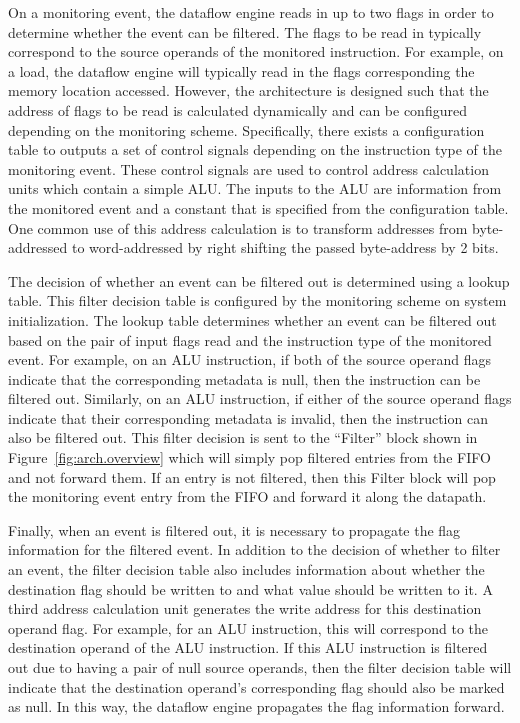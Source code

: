 On a monitoring event, the dataflow engine reads in up to two flags in order to
determine whether the event can be filtered.  The flags to be read in typically correspond to the source
operands of the monitored instruction. For example, on a load, the dataflow
engine will typically read in the flags corresponding the memory location
accessed.
However, the architecture is designed such that the address of flags to be read
is calculated dynamically and can be configured depending on the monitoring
scheme. Specifically, there exists a configuration table to outputs a set of
control signals depending on the instruction type of the monitoring event.
These control signals are used to control address calculation units which
contain a simple ALU. The inputs to the ALU are information from the monitored
event and a constant that is specified from the configuration table. One common
use of this address calculation is to transform addresses from byte-addressed
to word-addressed by right shifting the passed byte-address by 2 bits.

The decision of whether an event can be filtered out is determined using a
lookup table. This filter decision table is configured by the monitoring scheme
on system initialization. The lookup table determines whether an event can be
filtered out based on the pair of input flags read and the instruction type of
the monitored event.
For example, on an ALU instruction, if both of the source operand flags
indicate that the corresponding metadata is null, then the instruction can be
filtered out. Similarly, on an ALU instruction, if either of the source operand
flags indicate that their corresponding metadata is invalid, then the
instruction can also be filtered out. This filter decision is sent to the
``Filter'' block shown in Figure~\ref{fig:arch.overview} which will simply pop
filtered entries from the FIFO and not forward them. If an entry is not
filtered, then this Filter block will pop the monitoring event entry from the
FIFO and forward it along the datapath.

Finally, when an event is filtered out, it is necessary to propagate the flag
information for the filtered event. In addition to the decision of whether to
filter an event, the filter decision table also includes information about
whether the destination flag should be written to and what value should be
written to it. A third address calculation unit generates the write address for
this destination operand flag. For example, for an ALU instruction, this will
correspond to the destination operand of the ALU instruction. If this ALU
instruction is filtered out due to having a pair of null source operands, then
the filter decision table will indicate that the destination operand's
corresponding flag should also be marked as null. In this way, the dataflow
engine propagates the flag information forward.


